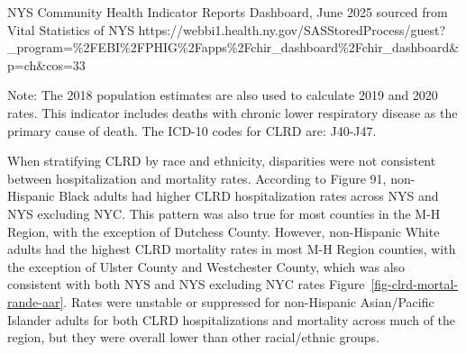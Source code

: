 \documentclass[
  english,
  letterpaper,
]{report}
\begin{document}
\begin{tcolorbox}[enhanced jigsaw, breakable, leftrule=.75mm, title=\textcolor{quarto-callout-note-color}{\faInfo}\hspace{0.5em}{Source}, bottomrule=.15mm, opacityback=0, left=2mm, colback=white, bottomtitle=1mm, coltitle=black, colbacktitle=quarto-callout-note-color!10!white, colframe=quarto-callout-note-color-frame, opacitybacktitle=0.6, toptitle=1mm, titlerule=0mm, arc=.35mm, rightrule=.15mm, toprule=.15mm]

NYS Community Health Indicator Reports Dashboard, June 2025 sourced from
Vital Statistics of NYS
https://webbi1.health.ny.gov/SASStoredProcess/guest?\_program=\%2FEBI\%2FPHIG\%2Fapps\%2Fchir\_dashboard\%2Fchir\_dashboard\&p=ch\&cos=33

\end{tcolorbox}

\begin{tcolorbox}[enhanced jigsaw, breakable, leftrule=.75mm, title=\textcolor{quarto-callout-note-color}{\faInfo}\hspace{0.5em}{Note}, bottomrule=.15mm, opacityback=0, left=2mm, colback=white, bottomtitle=1mm, coltitle=black, colbacktitle=quarto-callout-note-color!10!white, colframe=quarto-callout-note-color-frame, opacitybacktitle=0.6, toptitle=1mm, titlerule=0mm, arc=.35mm, rightrule=.15mm, toprule=.15mm]

Note: The 2018 population estimates are also used to calculate 2019 and
2020 rates. This indicator includes deaths with chronic lower
respiratory disease as the primary cause of death. The ICD-10 codes for
CLRD are: J40-J47.

\end{tcolorbox}

When stratifying CLRD by race and ethnicity, disparities were not
consistent between hospitalization and mortality rates. According to
Figure 91, non-Hispanic Black adults had higher CLRD hospitalization
rates across NYS and NYS excluding NYC. This pattern was also true for
most counties in the M-H Region, with the exception of Dutchess County.
However, non-Hispanic White adults had the highest CLRD mortality rates
in most M-H Region counties, with the exception of Ulster County and
Westchester County, which was also consistent with both NYS and NYS
excluding NYC rates Figure~\ref{fig-clrd-mortal-rande-aar}. Rates were
unstable or suppressed for non-Hispanic Asian/Pacific Islander adults
for both CLRD hospitalizations and mortality across much of the region,
but they were overall lower than other racial/ethnic groups.
\end{document}
